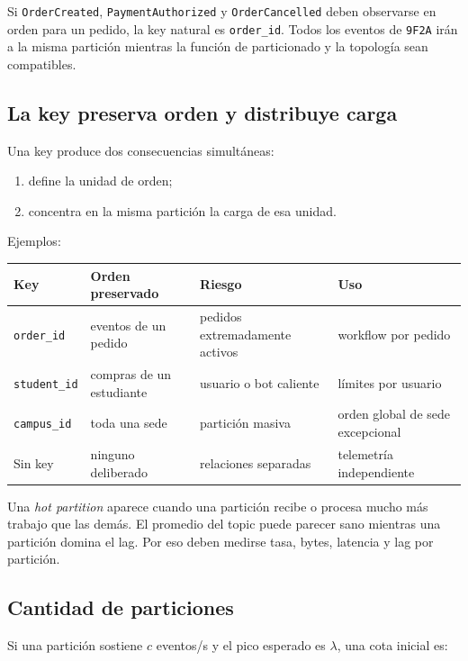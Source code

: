 \documentclass[variant=apuntes,cover=institutional,mode=screen]{ua-engineering-v6-article}
\begin{document}
Si \texttt{OrderCreated}, \texttt{PaymentAuthorized} y \texttt{OrderCancelled} deben observarse en orden para un pedido, la key natural es \texttt{order\_id}. Todos los eventos de \texttt{9F2A} irán a la misma partición mientras la función de particionado y la topología sean compatibles.

\subsection{La key preserva orden y distribuye carga}

Una key produce dos consecuencias simultáneas:

\begin{enumerate}
\item define la unidad de orden;
\item concentra en la misma partición la carga de esa unidad.
\end{enumerate}

Ejemplos:

\begin{center}
\small
\begin{tabular}{p{}p{}p{}p{}}
\toprule
Key & Orden preservado & Riesgo & Uso \\
\midrule
\texttt{order\_id} & eventos de un pedido & pedidos extremadamente activos & workflow por pedido \\
\texttt{student\_id} & compras de un estudiante & usuario o bot caliente & límites por usuario \\
\texttt{campus\_id} & toda una sede & partición masiva & orden global de sede excepcional \\
Sin key & ninguno deliberado & relaciones separadas & telemetría independiente \\
\bottomrule
\end{tabular}
\end{center}

Una \emph{hot partition} aparece cuando una partición recibe o procesa mucho más trabajo que las demás. El promedio del topic puede parecer sano mientras una partición domina el lag. Por eso deben medirse tasa, bytes, latencia y lag por partición.

\subsection{Cantidad de particiones}

Si una partición sostiene $c$ eventos/s y el pico esperado es $\lambda$, una cota inicial es:
\end{document}
